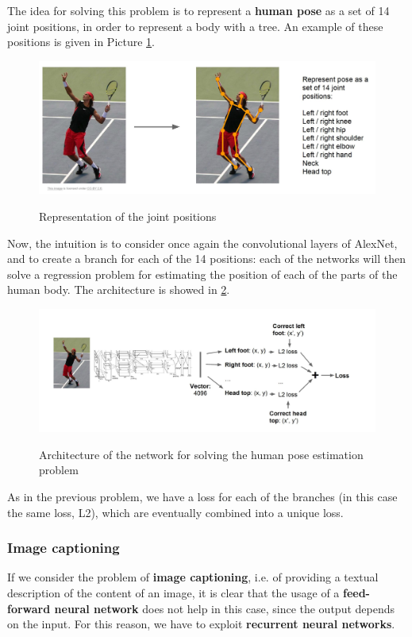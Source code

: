 The idea for solving this problem is to represent a \textbf{human pose} as a set of 14 joint positions, in order to represent a body with a tree. An example of these positions is given in Picture \ref{human pose 1}.

\begin{figure}[h!]
		\centering
        \includegraphics[scale = 0.35]{img/human pose estimation 1.jpg}
		\label{human pose 1}
        \caption{Representation of the joint positions}
\end{figure}

Now, the intuition is to consider once again the convolutional layers of AlexNet, and to create a branch for each of the 14 positions: each of the networks will then solve a regression problem for estimating the position of each of the parts of the human body. The architecture is showed in \ref{human pose 2}.

\begin{figure}[h!]
		\centering
        \includegraphics[scale = 0.45]{img/human pose estimation 2.jpg}
		\label{human pose 2}
        \caption{Architecture of the network for solving the human pose estimation problem}
\end{figure}

As in the previous problem, we have a loss for each of the branches (in this case the same loss, L2), which are eventually combined into a unique loss.

\subsubsection{Image captioning}
If we consider the problem of \textbf{image captioning}, i.e. of providing a textual description of the content of an image, it is clear that the usage of a \textbf{feed-forward neural network} does not help in this case, since the output depends on the input. For this reason, we have to exploit \textbf{recurrent neural networks}.

